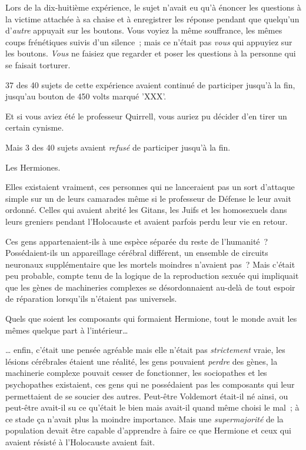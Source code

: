 Lors de la dix-huitième expérience, le sujet n'avait eu qu'à énoncer les questions à la victime attachée à sa chaise et à enregistrer les réponse pendant que quelqu'un d'\emph{autre} appuyait sur les boutons. Vous voyiez la même souffrance, les mêmes coups frénétiques suivis d'un silence~; mais ce n'était pas \emph{vous} qui appuyiez sur les boutons. \emph{Vous} ne faisiez que regarder et poser les questions à la personne qui se faisait torturer.

37 des 40 sujets de cette expérience avaient continué de participer jusqu'à la fin, jusqu'au bouton de 450 volts marqué 'XXX'.

Et si vous aviez été le professeur Quirrell, vous auriez pu décider d'en tirer un certain cynisme.

Mais 3 des 40 sujets avaient \emph{refusé} de participer jusqu'à la fin.

Les Hermiones.

Elles existaient vraiment, ces personnes qui ne lanceraient pas un sort d'attaque simple sur un de leurs camarades même si le professeur de Défense le leur avait ordonné. Celles qui avaient abrité les Gitans, les Juifs et les homosexuels dans leurs greniers pendant l'Holocauste et avaient parfois perdu leur vie en retour.

Ces gens appartenaient-ils à une espèce séparée du reste de l'humanité~? Possédaient-ils un appareillage cérébral différent, un ensemble de circuits neuronaux supplémentaire que les mortels moindres n'avaient pas~? Mais c'était peu probable, compte tenu de la logique de la reproduction sexuée qui impliquait que les gènes de machineries complexes se désordonnaient au-delà de tout espoir de réparation lorsqu'ils n'étaient pas universels.

Quels que soient les composants qui formaient Hermione, tout le monde avait les mêmes quelque part à l'intérieur…

… enfin, c'était une pensée agréable mais elle n'était pas \emph{strictement} vraie, les lésions cérébrales étaient une réalité, les gens pouvaient \emph{perdre} des gènes, la machinerie complexe pouvait cesser de fonctionner, les sociopathes et les psychopathes existaient, ces gens qui ne possédaient pas les composants qui leur permettaient de se soucier des autres. Peut-être Voldemort était-il né ainsi, ou peut-être avait-il su ce qu'était le bien mais avait-il quand même choisi le mal~; à ce stade ça n'avait plus la moindre importance. Mais une \emph{supermajorité} de la population devait être capable d'apprendre à faire ce que Hermione et ceux qui avaient résisté à l'Holocauste avaient fait.

